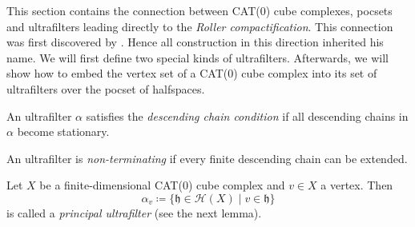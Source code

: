 This section contains the connection between CAT(0) cube complexes, pocsets and ultrafilters leading directly to the \emph{Roller compactification}. This connection was first discovered by \textcite{Roller1999}. Hence all construction in this direction inherited his name. We will first define two special kinds of ultrafilters. Afterwards, we will show how to embed the vertex set of a CAT(0) cube complex into its set of ultrafilters over the pocset of halfspaces. 





\begin{defin}
  An ultrafilter \(\alpha\) satisfies the \emph{descending chain condition} if all descending chains in \(\alpha\) become stationary.

  An ultrafilter is \emph{non-terminating} if every finite descending chain can be extended.

  Let \(X\) be a finite-dimensional CAT(0) cube complex and \(v \in X\) a vertex. Then
  \[
    \alpha_v \coloneqq \{\mathfrak{h} \in \mathcal{H}(X) \mid v \in \mathfrak{h}\}
  \]
  is called a \emph{principal ultrafilter} (see the next lemma).
\end{defin}

